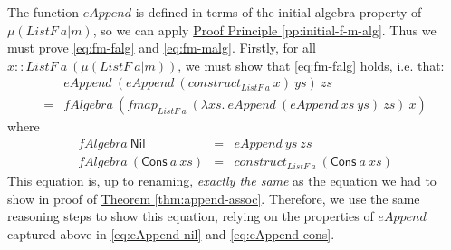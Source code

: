 \documentclass{jfp1}
\newcommand{\proofprinref}[1]{\hyperref[#1]{Proof Principle \ref*{#1}}}
\newcommand{\thmref}[1]{\hyperref[#1]{Theorem \ref*{#1}}}
\begin{document}
\begin{proof*}
  The function $\mathit{eAppend}$ is defined in terms of the initial
  algebra property of $\mu(\mathit{ListF}~a|m)$, so we can apply
  \proofprinref{pp:initial-f-m-alg}. Thus we must prove
  \autoref{eq:fm-falg} and \autoref{eq:fm-malg}. Firstly, for all $x
  :: \mathit{ListF}~a~(\mu(\mathit{ListF}~a|m))$, we must show that
  \autoref{eq:fm-falg} holds, i.e. that:
  \begin{displaymath}
    \begin{array}{cl}
      &\mathit{eAppend}~(\mathit{eAppend}~(\mathit{construct}_{\mathit{ListF}~a}~x)~\mathit{ys})~\mathit{zs}\\
      =&\mathit{fAlgebra}~(\mathit{fmap}_{\mathit{ListF}~a}~(\lambda \mathit{xs}.~\mathit{eAppend}~(\mathit{eAppend}~\mathit{xs}~\mathit{ys})~\mathit{zs})~x)
    \end{array}
  \end{displaymath}
  where
  \begin{displaymath}
    \begin{array}{rcl}
      \mathit{fAlgebra}~\mathsf{Nil} &=& \mathit{eAppend}~\mathit{ys}~\mathit{zs} \\
      \mathit{fAlgebra}~(\mathsf{Cons}~a~\mathit{xs}) &=& \mathit{construct}_{\mathit{ListF}~a}~(\mathsf{Cons}~a~\mathit{xs})
    \end{array}
  \end{displaymath}
  This equation is, up to renaming, \emph{exactly the same} as the
  equation we had to show in proof of
  \thmref{thm:append-assoc}. Therefore, we use the same reasoning
  steps to show this equation, relying on the properties of
  $\mathit{eAppend}$ captured above in \autoref{eq:eAppend-nil} and
  \autoref{eq:eAppend-cons}.


\end{proof*}
\end{document}
